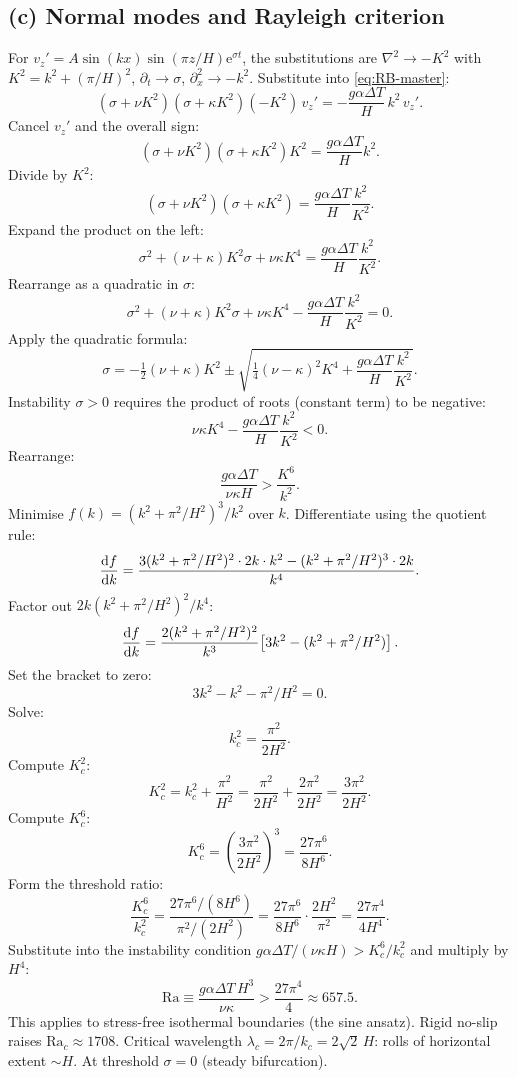\documentclass[11pt]{article}
\newcommand{\Lap}{\nabla^{2}}
\begin{document}
\subsection*{(c) Normal modes and Rayleigh criterion}

For $v_z' = A\sin(kx)\sin(\pi z/H)\mathrm{e}^{\sigma t}$, the substitutions are $\Lap\to -K^2$ with $K^2 = k^2+(\pi/H)^2$, $\partial_t\to\sigma$, $\partial_x^2\to -k^2$. Substitute into \eqref{eq:RB-master}:
\[ (\sigma+\nu K^2)(\sigma+\kappa K^2)(-K^2)\,v_z' = -\frac{g\alpha\Delta T}{H}\,k^2\,v_z'. \]
Cancel $v_z'$ and the overall sign:
\[ (\sigma+\nu K^2)(\sigma+\kappa K^2)K^2 = \frac{g\alpha\Delta T}{H}k^2. \]
Divide by $K^2$:
\[ (\sigma+\nu K^2)(\sigma+\kappa K^2) = \frac{g\alpha\Delta T}{H}\frac{k^2}{K^2}. \]
Expand the product on the left:
\[ \sigma^2 + (\nu+\kappa)K^2\sigma + \nu\kappa K^4 = \frac{g\alpha\Delta T}{H}\frac{k^2}{K^2}. \]
Rearrange as a quadratic in $\sigma$:
\[ \sigma^2 + (\nu+\kappa)K^2\sigma + \nu\kappa K^4 - \frac{g\alpha\Delta T}{H}\frac{k^2}{K^2} = 0. \]
Apply the quadratic formula:
\begin{equation}
\boxed{\;\sigma = -\tfrac{1}{2}(\nu+\kappa)K^2 \pm \sqrt{\tfrac{1}{4}(\nu-\kappa)^2 K^4 + \frac{g\alpha\Delta T}{H}\frac{k^2}{K^2}}.\;}
\end{equation}
Instability $\sigma>0$ requires the product of roots (constant term) to be negative:
\[ \nu\kappa K^4 - \frac{g\alpha\Delta T}{H}\frac{k^2}{K^2} < 0. \]
Rearrange:
\begin{equation}
\frac{g\alpha\Delta T}{\nu\kappa H} > \frac{K^6}{k^2}.
\label{eq:instab-cond}
\end{equation}
Minimise $f(k) = (k^2+\pi^2/H^2)^3/k^2$ over $k$. Differentiate using the quotient rule:
\[ \dv{f}{k} = \frac{3(k^2+\pi^2/H^2)^2\cdot 2k\cdot k^2 - (k^2+\pi^2/H^2)^3\cdot 2k}{k^4}. \]
Factor out $2k(k^2+\pi^2/H^2)^2/k^4$:
\[ \dv{f}{k} = \frac{2(k^2+\pi^2/H^2)^2}{k^3}\!\left[3k^2 - (k^2+\pi^2/H^2)\right]. \]
Set the bracket to zero:
\[ 3k^2 - k^2 - \pi^2/H^2 = 0. \]
Solve:
\[ k_c^2 = \frac{\pi^2}{2H^2}. \]
Compute $K_c^2$:
\[ K_c^2 = k_c^2 + \frac{\pi^2}{H^2} = \frac{\pi^2}{2H^2} + \frac{2\pi^2}{2H^2} = \frac{3\pi^2}{2H^2}. \]
Compute $K_c^6$:
\[ K_c^6 = \left(\frac{3\pi^2}{2H^2}\right)^3 = \frac{27\pi^6}{8H^6}. \]
Form the threshold ratio:
\[ \frac{K_c^6}{k_c^2} = \frac{27\pi^6/(8H^6)}{\pi^2/(2H^2)} = \frac{27\pi^6}{8H^6}\cdot\frac{2H^2}{\pi^2} = \frac{27\pi^4}{4H^4}. \]
Substitute into the instability condition $g\alpha\Delta T/(\nu\kappa H) > K_c^6/k_c^2$ and multiply by $H^4$:
\begin{equation}
\boxed{\;\mathrm{Ra} \equiv \frac{g\alpha\Delta T\,H^3}{\nu\kappa} > \frac{27\pi^4}{4} \approx 657.5.\;}
\end{equation}
This applies to stress-free isothermal boundaries (the sine ansatz). Rigid no-slip raises $\mathrm{Ra}_c\approx 1708$. Critical wavelength $\lambda_c = 2\pi/k_c = 2\sqrt 2\,H$: rolls of horizontal extent $\sim H$. At threshold $\sigma=0$ (steady bifurcation).
\end{document}
